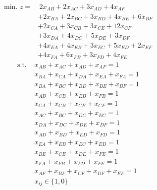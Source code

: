 \documentclass[a4paper,11pt]{article}
\begin{document}
\begin{align*}
    \text{min. } z  =&~ 2x_{AB} 
                    + 2x_{AC} 
                    + 3x_{AD} 
                    + 4x_{AF} \\
                    &+ 2x_{BA} 
                    + 2x_{BC} 
                    + 3x_{BD} 
                    + 4x_{BE} 
                    + 6x_{BF} \\
                    &+ 2x_{CA} 
                    + 3x_{CB} 
                    + 3x_{CE} 
                    + 12x_{CF} \\
                    &+ 3x_{DA} 
                    + 4x_{DC} 
                    + 5x_{DE} 
                    + 3x_{DF} \\
                    &+ 4x_{EA} 
                    + 4x_{EB} 
                    + 3x_{EC} 
                    + 5x_{ED} 
                    + 2x_{EF} \\
                    &+ 4x_{FA} 
                    + 6x_{FB} 
                    + 3x_{FD} 
                    + 4x_{FE}
\end{align*}
\begin{align*}
    \text{s.t. } & x_{AB} + x_{AC} + x_{AD} + x_{AF} = 1 \\ %
                 & x_{BA} + x_{CA} + x_{DA} + x_{EA} + x_{FA} = 1 \\ %
                 & x_{BA} + x_{BC} + x_{BD} + x_{BE} + x_{BF} = 1 \\ %
                 & x_{AB} + x_{CB} + x_{EB} + x_{FB} = 1 \\ %
                 & x_{CA} + x_{CB} + x_{CE} + x_{CF} = 1 \\ %
                 & x_{AC} + x_{BC} + x_{DC} + x_{EC} = 1 \\ %
                 & x_{DA} + x_{DC} + x_{DE} + x_{DF} = 1 \\ %
                 & x_{AD} + x_{BD} + x_{ED} + x_{FD} = 1 \\ %
                 & x_{EA} + x_{EB} + x_{EC} + x_{ED} = 1 \\ %
                 & x_{BE} + x_{CE} + x_{DE} + x_{FE} = 1 \\ %
                 & x_{FA} + x_{FB} + x_{FD} + x_{FE} = 1 \\ %
                 & x_{AF} + x_{BF} + x_{CF} + x_{DF} + x_{EF} = 1 \\ %
                 & x_{ij} \in \{1, 0\}
\end{align*}
\end{document}
